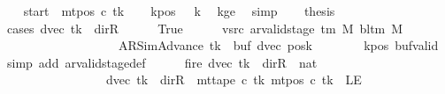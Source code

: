 \begin{isabellebody}
\ \ \isamarkupfalse%
\ {\isacharquery}{\kern0pt}start\ {\isacharequal}{\kern0pt}\ {\isachardoublequoteopen}mt{\isacharunderscore}{\kern0pt}pos\ c{}\ tk{\isachardoublequoteclose}\isanewline
\ \ \isamarkupfalse%
\ kpos{\isacharcolon}{\kern0pt}\ {\isachardoublequoteopen}{}\ {\isacharless}{\kern0pt}\ {\isacharquery}{\kern0pt}k{\isachardoublequoteclose}\ \isamarkupfalse%
\ kge{}\ \isamarkupfalse%
\ simp\isanewline
\ \ \isamarkupfalse%
\ {\isacharquery}{\kern0pt}thesis\isanewline
\ \ \isamarkupfalse%
\ {\isacharparenleft}{\kern0pt}cases\ {\isachardoublequoteopen}dvec\ tk\ {\isacharequal}{\kern0pt}\ dir{\isachardot}{\kern0pt}R{\isachardoublequoteclose}{\isacharparenright}{\kern0pt}\isanewline
\ \ \ \ \isamarkupfalse%
\ True\isanewline
\ \ \ \ \isamarkupfalse%
\ vsrc{}{\isacharcolon}{\kern0pt}\ {\isachardoublequoteopen}ar{\isacharunderscore}{\kern0pt}valid{\isacharunderscore}{\kern0pt}stage\ {\isacharparenleft}{\kern0pt}{\isasymGamma}{\isacharunderscore}{\kern0pt}tm\ M{\isacharparenright}{\kern0pt}\ {\isacharparenleft}{\kern0pt}bl{\isacharunderscore}{\kern0pt}tm\ M{\isacharparenright}{\kern0pt}\isanewline
\ \ \ \ \ \ \ \ \ \ \ \ \ \ \ \ \ \ \ {\isacharparenleft}{\kern0pt}AR{\isacharunderscore}{\kern0pt}SimAdvance{\isacharcomma}{\kern0pt}\ tk{\isacharcomma}{\kern0pt}\ {}{\isacharcomma}{\kern0pt}\ buf{\isacharcomma}{\kern0pt}\ dvec{\isacharcomma}{\kern0pt}\ posk{\isacharparenright}{\kern0pt}{\isachardoublequoteclose}\isanewline
\ \ \ \ \ \ \isamarkupfalse%
\ kpos\ buf{\isacharunderscore}{\kern0pt}valid\ \isamarkupfalse%
\ {\isacharparenleft}{\kern0pt}simp\ add{\isacharcolon}{\kern0pt}\ ar{\isacharunderscore}{\kern0pt}valid{\isacharunderscore}{\kern0pt}stage{\isacharunderscore}{\kern0pt}def{\isacharparenright}{\kern0pt}\isanewline
\ \ \ \ \isamarkupfalse%
\ fire{\isacharcolon}{\kern0pt}\ {\isachardoublequoteopen}{\isacharparenleft}{\kern0pt}dvec\ tk\ {\isacharequal}{\kern0pt}\ dir{\isachardot}{\kern0pt}R\ {\isasymand}\ {\isacharparenleft}{\kern0pt}{}{\isacharcolon}{\kern0pt}{\isacharcolon}{\kern0pt}nat{\isacharparenright}{\kern0pt}\ {\isacharequal}{\kern0pt}\ {}{\isacharparenright}{\kern0pt}\isanewline
\ \ \ \ \ \ \ \ \ \ \ \ \ \ \ \ {\isasymor}\ {\isacharparenleft}{\kern0pt}dvec\ tk\ {\isasymnoteq}\ dir{\isachardot}{\kern0pt}R\ {\isasymand}\ mt{\isacharunderscore}{\kern0pt}tape\ c{}\ tk\ {\isacharparenleft}{\kern0pt}mt{\isacharunderscore}{\kern0pt}pos\ c{}\ tk{\isacharparenright}{\kern0pt}\ {\isasymnoteq}\ LE{}\isanewline

\end{isabellebody}
